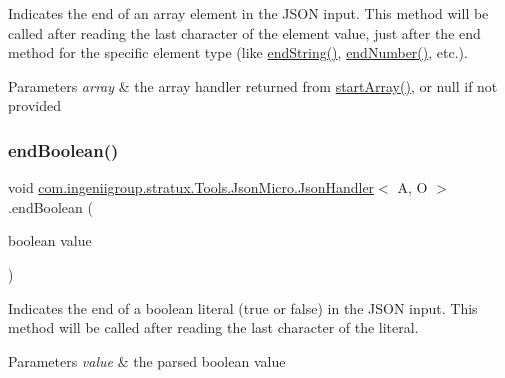 Indicates the end of an array element in the J\+S\+ON input. This method will be called after reading the last character of the element value, just after the {\ttfamily end} method for the specific element type (like \hyperlink{classcom_1_1ingeniigroup_1_1stratux_1_1_tools_1_1_json_micro_1_1_json_handler_ae3111ade860fb1882621cfca98062ddb}{end\+String()}, \hyperlink{classcom_1_1ingeniigroup_1_1stratux_1_1_tools_1_1_json_micro_1_1_json_handler_aa939647044a5d27c58b5a173cbab612d}{end\+Number()}, etc.).


\begin{DoxyParams}{Parameters}
{\em array} & the array handler returned from \hyperlink{classcom_1_1ingeniigroup_1_1stratux_1_1_tools_1_1_json_micro_1_1_json_handler_a573309df4295cb6a107c2936aa75bb85}{start\+Array()}, or {\ttfamily null} if not provided \\
\hline
\end{DoxyParams}
\mbox{\label{classcom_1_1ingeniigroup_1_1stratux_1_1_tools_1_1_json_micro_1_1_json_handler_a2b0cf30d38b4fe1b30224f2da6b1cf47}} 
\subsubsection{\texorpdfstring{end\+Boolean()}{endBoolean()}}
{\footnotesize\ttfamily void \hyperlink{classcom_1_1ingeniigroup_1_1stratux_1_1_tools_1_1_json_micro_1_1_json_handler}{com.\+ingeniigroup.\+stratux.\+Tools.\+Json\+Micro.\+Json\+Handler}$<$ A, O $>$.end\+Boolean (\begin{DoxyParamCaption}\item[{boolean}]{value }\end{DoxyParamCaption})}

Indicates the end of a boolean literal ({\ttfamily true} or {\ttfamily false}) in the J\+S\+ON input. This method will be called after reading the last character of the literal.


\begin{DoxyParams}{Parameters}
{\em value} & the parsed boolean value \\
\hline
\end{DoxyParams}
\mbox{\label{classcom_1_1ingeniigroup_1_1stratux_1_1_tools_1_1_json_micro_1_1_json_handler_aa8096823d8b0aa7841be6eb213cf90cc}} 
